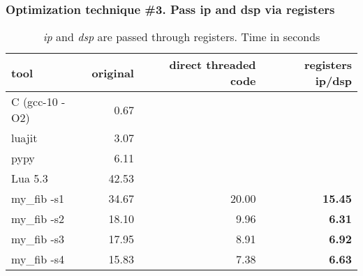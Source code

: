 \documentclass[hyperref={colorlinks=true},xcolor=table]{beamer}
\begin{document}
\begin{frame}[fragile]
  \frametitle{Optimization technique \#3. Pass ip and dsp via registers}
  \begin{table}
    \begin{tabular}{ | l | r | r | r | }
      \hline
      \rowcolor{lightgray} tool & original & direct threaded
      code & registers ip/dsp \\
      \hline
      C (gcc-10 -O2) &   0.67   &       & \\
      luajit         &   3.07   &       & \\
      pypy           &   6.11   &       & \\
      Lua 5.3        &  42.53   &       & \\
      \hline
      my\_fib -s1    &  34.67   & 20.00 & \textbf{15.45} \\
      my\_fib -s2    &  18.10   & 9.96  & \textbf{6.31} \\
      my\_fib -s3    &  17.95   & 8.91  & \textbf{6.92} \\
      my\_fib -s4    &  15.83   & 7.38  & \textbf{6.63} \\
      \hline
    \end{tabular}
    \caption{\textit{ip} and \textit{dsp} are passed through registers. Time in seconds}
  \end{table}
\end{frame}
\end{document}
